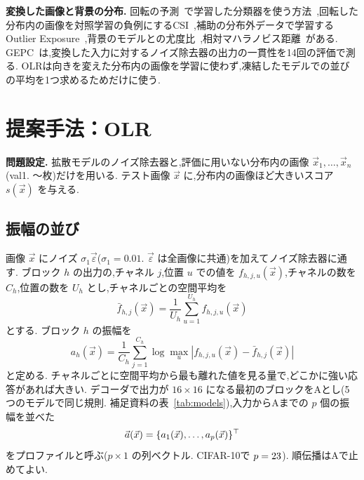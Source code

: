 \documentclass[MIRU,submit]{miru2025j}
\newcommand{\veps}{\vec{\varepsilon}}
\newcommand{\Ours}{OLR}   %
\begin{document}
\textbf{変換した画像と背景の分布.} 回転の予測~\cite{gidaris2018rotnet}で学習した分類器を使う方法~\cite{golan2018geometric,hendrycks2019ss},回転した分布内の画像を対照学習の負例にするCSI~\cite{tack2020csi},補助の分布外データで学習するOutlier Exposure~\cite{hendrycks2019oe},背景のモデルとの尤度比~\cite{ren2019likelihood},相対マハラノビス距離~\cite{ren2021simple}がある. GEPC~\cite{alexis2026gepc}は,変換した入力に対するノイズ除去器の出力の一貫性を14回の評価で測る. \Ours{}は向きを変えた分布内の画像を学習に使わず,凍結したモデルでの並びの平均を1つ求めるためだけに使う.

\section{提案手法：\Ours}
\label{sec:method}
\textbf{問題設定.} 拡散モデルのノイズ除去器と,評価に用いない分布内の画像 $\vec{x}_1,\dots,\vec{x}_n$(val1. \olNRefMin{}〜\olNRefMax{}枚)だけを用いる. テスト画像 $\vec{x}$ に,分布内の画像ほど大きいスコア $s(\vec{x})$ を与える.

\subsection{振幅の並び}
\label{sec:amp}
画像 $\vec{x}$ にノイズ $\sigma_1\veps$($\sigma_1=0.01$. $\veps$ は全画像に共通)を加えてノイズ除去器に通す. ブロック $h$ の出力の,チャネル $j$,位置 $u$ での値を $f_{h,j,u}(\vec{x})$,チャネルの数を $C_h$,位置の数を $U_h$ とし,チャネルごとの空間平均を
\begin{equation}
\bar{f}_{h,j}(\vec{x})=\frac{1}{U_h}\sum_{u=1}^{U_h}f_{h,j,u}(\vec{x})
\label{eq:fbar}
\end{equation}
とする. ブロック $h$ の振幅を
\begin{equation}
a_h(\vec{x})=\frac{1}{C_h}\sum_{j=1}^{C_h}\log\max_{u}|f_{h,j,u}(\vec{x})-\bar{f}_{h,j}(\vec{x})|
\label{eq:amp}
\end{equation}
と定める. チャネルごとに空間平均から最も離れた値を見る量で,どこかに強い応答があれば大きい. デコーダで出力が $16{\times}16$ になる最初のブロックをAとし(5つのモデルで同じ規則. 補足資料の表~\ref{tab:models}),入力からAまでの $p$ 個の振幅を並べた
\begin{equation}
\vec{a}(\vec{x})=\{a_1(\vec{x}),\dots,a_p(\vec{x})\}^{\top}
\label{eq:profile}
\end{equation}
をプロファイルと呼ぶ($p\times 1$ の列ベクトル. CIFAR-10で $p=23$). 順伝播はAで止めてよい.
\end{document}
